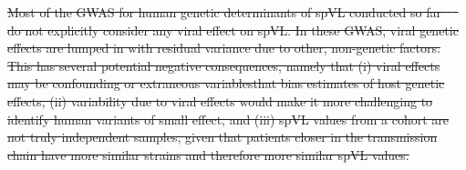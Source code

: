 \documentclass[11pt]{article} %
\providecommand{\DIFdel}[1]{{\protect\color{red}\sout{#1}}}                      %
\begin{document}
\begin{linenumbers}
\DIFdel{Most of the GWAS for human genetic determinants of spVL conducted so far \mbox{%
\citep{Dalmasso2008, Fellay2007, Pereyra2010, Fellay2009, Pelak2010, VanManen2011, McLaren2012, McLaren2015} }\hskip0pt%
do not explicitly consider any viral effect on spVL. In these GWAS, viral genetic effects are lumped in with residual variance due to other, non-genetic factors. This has several potential negative consequences, namely that (i) viral effects may be confounding or extraneous variablesthat bias estimates of host genetic effects, (ii) variability due to viral effects would make it more challenging to identify human variants of small effect, and (iii) spVL values from a cohort are not truly independent samples, given that patients closer in the transmission chain have more similar strains and therefore more similar spVL values. }%


\end{linenumbers}
\end{document}

